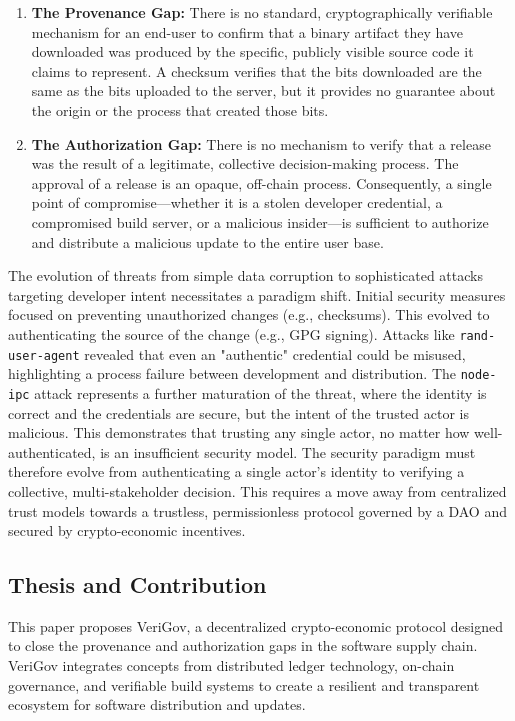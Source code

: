 \documentclass{article}
\begin{document}
\begin{enumerate}
\item \textbf{The Provenance Gap:} There is no standard, cryptographically verifiable mechanism for an end-user to confirm that a binary artifact they have downloaded was produced by the specific, publicly visible source code it claims to represent. A checksum verifies that the bits downloaded are the same as the bits uploaded to the server, but it provides no guarantee about the origin or the process that created those bits.~\cite{lamb2022reproducible}
\item \textbf{The Authorization Gap:} There is no mechanism to verify that a release was the result of a legitimate, collective decision-making process. The approval of a release is an opaque, off-chain process. Consequently, a single point of compromise---whether it is a stolen developer credential, a compromised build server, or a malicious insider---is sufficient to authorize and distribute a malicious update to the entire user base.~\cite{aikido2025rand}
\end{enumerate}

The evolution of threats from simple data corruption to sophisticated attacks targeting developer intent necessitates a paradigm shift. Initial security measures focused on preventing unauthorized changes (e.g., checksums). This evolved to authenticating the source of the change (e.g., GPG signing). Attacks like \lstinline{rand-user-agent} revealed that even an "authentic" credential could be misused, highlighting a process failure between development and distribution. The \lstinline{node-ipc} attack represents a further maturation of the threat, where the identity is correct and the credentials are secure, but the intent of the trusted actor is malicious. This demonstrates that trusting any single actor, no matter how well-authenticated, is an insufficient security model. The security paradigm must therefore evolve from authenticating a single actor's identity to verifying a collective, multi-stakeholder decision. This requires a move away from centralized trust models towards a trustless, permissionless protocol governed by a DAO and secured by crypto-economic incentives.~\cite{wright2015decentralized}

\subsection{Thesis and Contribution}

This paper proposes VeriGov, a decentralized crypto-economic protocol designed to close the provenance and authorization gaps in the software supply chain. VeriGov integrates concepts from distributed ledger technology, on-chain governance, and verifiable build systems to create a resilient and transparent ecosystem for software distribution and updates.
\end{document}
